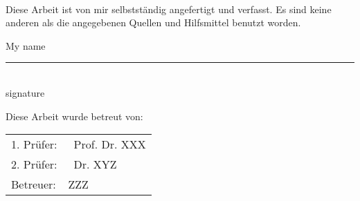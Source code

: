 \clearpage

\mbox{}
\vspace{1.5cm}\\
\noindent Diese Arbeit ist von mir selbstständig angefertigt und verfasst. Es sind keine anderen als die angegebenen Quellen und Hilfsmittel benutzt worden.

\vspace{1cm}
My name \tab[1.5cm] \rule{40mm}{0.2mm}\\
\tab[5cm] signature

\vspace{3cm}
Diese Arbeit wurde betreut von:

	\begin{minipage}[t]{13cm}
		\centering 
		\begin{tabular}{p{4cm}l}
			
			1. Pr\"{u}fer: & ~Prof. Dr. XXX\\
			2. Pr\"{u}fer: & ~Dr. XYZ\\
	
	        Betreuer: & ZZZ\\
			
		\end{tabular}
	\end{minipage}

	\vspace{1.5cm}
